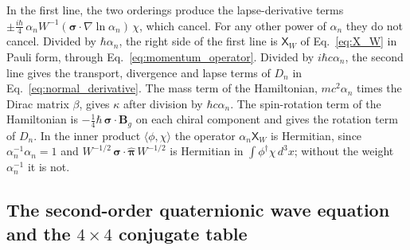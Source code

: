 \documentclass[aps,prd,onecolumn,tightenlines,nofootinbib,notitlepage,11pt,floatfix]{revtex4-2}
\theoremstyle{indentedtheorem}
\begin{document}
In the first line, the two orderings produce the lapse-derivative terms $\pm\tfrac{i\hbar}{4}\,\alpha_nW^{-1}(\boldsymbol{\sigma}\cdot\nabla\ln\alpha_n)\,\chi$, which cancel. For any other power of $\alpha_n$ they do not cancel. Divided by $\hbar\alpha_n$, the right side of the first line is $\mathsf{X}_W$ of Eq.~\eqref{eq:X_W} in Pauli form, through Eq.~\eqref{eq:momentum_operator}. Divided by $i\hbar c\alpha_n$, the second line gives the transport, divergence and lapse terms of $D_n$ in Eq.~\eqref{eq:normal_derivative}. The mass term of the Hamiltonian, $mc^2\alpha_n$ times the Dirac matrix $\beta$, gives $\kappa$ after division by $\hbar c\alpha_n$. The spin-rotation term of the Hamiltonian is $-\tfrac{1}{4}\hbar\,\boldsymbol{\sigma}\cdot\mathbf{B}_g$ on each chiral component and gives the rotation term of $D_n$. In the inner product $\langle\phi,\chi\rangle$ the operator $\alpha_n\mathsf{X}_W$ is Hermitian, since $\alpha_n^{-1}\alpha_n=1$ and $W^{-1/2}\,\boldsymbol{\sigma}\cdot\hat{\boldsymbol{\pi}}\,W^{-1/2}$ is Hermitian in $\int\phi^\dagger\chi\,d^3x$; without the weight $\alpha_n^{-1}$ it is not.

\subsection{The second-order quaternionic wave equation and the \texorpdfstring{$4\times 4$}{4x4} conjugate table}
\label{sec:second_order_table}
\end{document}
